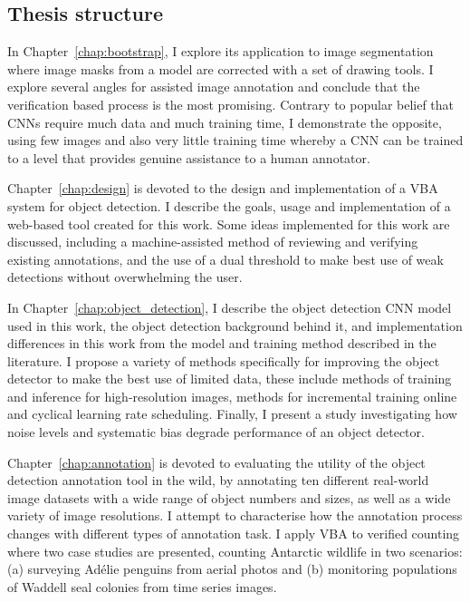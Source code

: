 \subsection {Thesis structure} 



In Chapter~\ref{chap:bootstrap}, I explore its application to image segmentation where image masks from a model are corrected with a set of drawing tools. I explore several angles for assisted image annotation and conclude that the verification based process is the most promising. Contrary to popular belief that \gls{CNN}s require much data and much training time, I demonstrate the opposite,  using few images and also very little training time whereby a \gls{CNN} can be trained to a level that provides genuine assistance to a human annotator. 

Chapter~\ref{chap:design} is devoted to the design and implementation of a \gls{VBA} system for object detection. I describe the goals, usage and implementation of a web-based tool created for this work. Some ideas implemented for this work are discussed, including a machine-assisted method of reviewing and verifying existing annotations, and the use of a dual threshold to make best use of weak detections without overwhelming the user.

In Chapter~\ref{chap:object_detection}, I describe the object detection \gls{CNN} model used in this work, the object detection background behind it, and implementation differences in this work from the model and training method described in the literature. I propose a variety of methods specifically for improving the object detector to make the best use of limited data, these include methods of training and inference for high-resolution images, methods for incremental training online and cyclical learning rate scheduling. Finally, I present a study investigating how noise levels and systematic bias degrade performance of an object detector. 

Chapter~\ref{chap:annotation} is devoted to evaluating the utility of the object detection annotation tool in the wild, by annotating ten different real-world image datasets with a wide range of object numbers and sizes, as well as a wide variety of image resolutions. I attempt to characterise how the annotation process changes with different types of annotation task. I apply \gls{VBA} to verified counting where two case studies are presented, counting Antarctic wildlife in two scenarios: (a) surveying Ad\'elie penguins from aerial photos and (b) monitoring populations of Waddell seal colonies from time series images.

